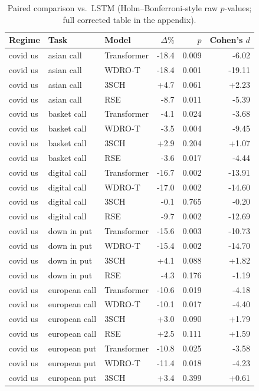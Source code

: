 \begin{table}[h]\centering\scriptsize
\caption{Paired comparison vs.\ LSTM (Holm--Bonferroni-style raw $p$-values; full corrected table in the appendix).}
\label{tab:paired_medium}
\begin{tabular}{lllrrr}
\toprule
Regime & Task & Model & $\Delta\%$ & $p$ & Cohen's $d$ \\\midrule
covid us & asian call & Transformer & -18.4 & 0.009 & -6.02 \\
covid us & asian call & WDRO-T & -18.4 & 0.001 & -19.11 \\
covid us & asian call & 3SCH & +4.7 & 0.061 & +2.23 \\
covid us & asian call & RSE & -8.7 & 0.011 & -5.39 \\
covid us & basket call & Transformer & -4.1 & 0.024 & -3.68 \\
covid us & basket call & WDRO-T & -3.5 & 0.004 & -9.45 \\
covid us & basket call & 3SCH & +2.9 & 0.204 & +1.07 \\
covid us & basket call & RSE & -3.6 & 0.017 & -4.44 \\
covid us & digital call & Transformer & -16.7 & 0.002 & -13.91 \\
covid us & digital call & WDRO-T & -17.0 & 0.002 & -14.60 \\
covid us & digital call & 3SCH & -0.1 & 0.765 & -0.20 \\
covid us & digital call & RSE & -9.7 & 0.002 & -12.69 \\
covid us & down in put & Transformer & -15.6 & 0.003 & -10.73 \\
covid us & down in put & WDRO-T & -15.4 & 0.002 & -14.70 \\
covid us & down in put & 3SCH & +4.1 & 0.088 & +1.82 \\
covid us & down in put & RSE & -4.3 & 0.176 & -1.19 \\
covid us & european call & Transformer & -10.6 & 0.019 & -4.18 \\
covid us & european call & WDRO-T & -10.1 & 0.017 & -4.40 \\
covid us & european call & 3SCH & +3.0 & 0.090 & +1.79 \\
covid us & european call & RSE & +2.5 & 0.111 & +1.59 \\
covid us & european put & Transformer & -10.8 & 0.025 & -3.58 \\
covid us & european put & WDRO-T & -11.4 & 0.018 & -4.23 \\
covid us & european put & 3SCH & +3.4 & 0.399 & +0.61 \\

\end{tabular}
\end{table}
